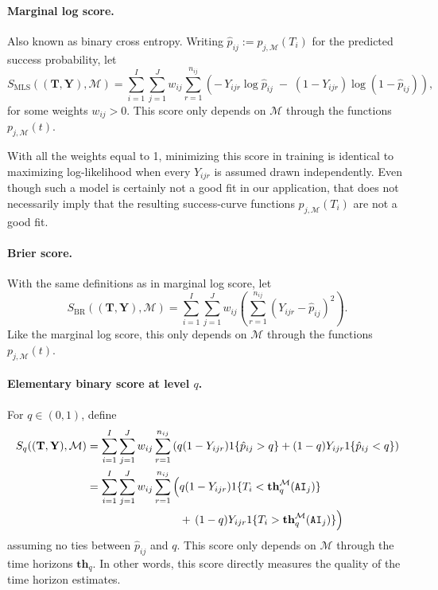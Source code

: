 \documentclass{article}
\theoremstyle{definition}
\newcommand{\thq}[1][q]{\mathbf{th}_{#1}}
\newcommand{\AI}{\texttt{AI}}
\begin{document}

\paragraph{Marginal log score.} Also known as binary cross entropy. Writing $\hat p_{ij} := p_{j, \mathcal{M}}(T_i)$ for the predicted success probability, let
\[
    S_{\mathrm{MLS}}((\mathbf{T}, \mathbf{Y}), \mathcal{M}) = \sum_{i = 1}^I \sum_{j = 1}^J w_{ij} \sum_{r = 1}^{n_{ij}} \left( -\,Y_{ijr} \log \hat p_{ij} \;-\; (1-Y_{ijr}) \log(1-\hat p_{ij})\right),
\]
for some weights $w_{ij} > 0$. This score only depends on $\mathcal{M}$ through the functions $p_{j, \mathcal{M}}(t)$. 

With all the weights equal to 1, minimizing this score in training is identical to maximizing log-likelihood when every $Y_{ijr}$ is assumed drawn independently. Even though such a model is certainly not a good fit in our application, that does not necessarily imply that the resulting success-curve functions $p_{j, \mathcal{M}}(T_i)$ are not a good fit. 

\paragraph{Brier score.} With the same definitions as in marginal log score, let
\[
    S_{\mathrm{BR}}((\mathbf{T}, \mathbf{Y}), \mathcal{M}) = \sum_{i = 1}^I \sum_{j = 1}^J w_{ij} \left( \sum_{r = 1}^{n_{ij}} \left(Y_{ijr} - \hat p_{ij}\right)^2 \right).
\]
Like the marginal log score, this only depends on $\mathcal{M}$ through the functions $p_{j, \mathcal{M}}(t)$. 

\paragraph{Elementary binary score at level $q$.} For $q \in (0,1)$, define
\begin{align*}
    S_{q}((\mathbf{T}, \mathbf{Y}), \mathcal{M}) 
        &= \sum_{i = 1}^I \sum_{j = 1}^J w_{ij} \sum_{r = 1}^{n_{ij}} \left( q (1 - Y_{ijr}) 1\{\hat p_{ij} > q\} + (1 - q) Y_{ijr} 1\{\hat p_{ij} < q\} \right) \\
        &= \sum_{i = 1}^I \sum_{j = 1}^J w_{ij} \sum_{r = 1}^{n_{ij}} \Big( q (1 - Y_{ijr}) 1\{T_i < \thq^\mathcal{M}(\AI_j)\} \\
        &\hphantom{{}= \sum_{i = 1}^I \sum_{j = 1}^J w_{ij} \sum_{r = 1}^{n_{ij}} \Big(}
            + \, (1 - q) Y_{ijr} 1\{T_i > \thq^\mathcal{M}(\AI_j)\} \Big)
\end{align*}
assuming no ties between $\hat p_{ij}$ and $q$. This score only depends on $\mathcal{M}$ through the time horizons $\thq$. In other words, this score directly measures the quality of the time horizon estimates. 
\end{document}
